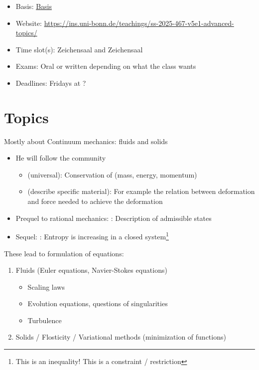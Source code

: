 \begin{tcolorbox}[enhanced,breakable,
	title=General Information,frame style={color=mycolor}]
    \begin{itemize}
        \item Basis: \href{https://basis.uni-bonn.de/qisserver/rds?state=verpublish&status=init&vmfile=no&publishid=256365&moduleCall=webInfo&publishConfFile=webInfo&publishSubDir=veranstaltung}{Basis}
        \item Website: \href{https://ins.uni-bonn.de/teachings/ss-2025-467-v5e1-advanced-topics/}{https://ins.uni-bonn.de/teachings/ss-2025-467-v5e1-advanced-topics/}
        \item Time slot(s):  Zeichensaal and  Zeichensaal
        \item Exams: Oral or written depending on what the class wants
        \item Deadlines: Fridays at ?
    \end{itemize}
\end{tcolorbox}

\section{Topics}

Mostly about Continuum mechanics: fluids and solids

\begin{itemize}
    \item He will follow the  community \begin{itemize}
        \item {} (universal): Conservation of (mass, energy, momentum)
        \item {} (describe specific material): For example the relation between deformation and force needed to achieve the deformation
    \end{itemize}
    \item Prequel to rational mechanics: : Description of admissible states
    \item Sequel: : Entropy is increasing in a closed system\footnote{This is an inequality! This is a constraint / restriction}
\end{itemize}

These lead to formulation of equations:
\begin{enumerate}
    \item Fluids (Euler equations, Navier-Stokes equations) \begin{itemize}
        \item Scaling laws
        \item Evolution equations, questions of singularities
        \item Turbulence 
    \end{itemize}
    \item Solids / Flosticity / Variational methods (minimization of functions) 
\end{enumerate}
 
